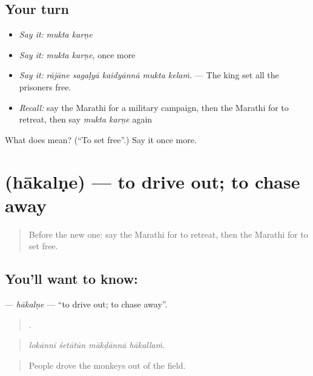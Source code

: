 \subsection*{Your turn}
\begin{itemize}
\raggedright
  \item \emph{Say it:} \emph{mukta karṇe}
  \item \emph{Say it:} \emph{mukta karṇe}, once more
  \item \emph{Say it:} \emph{rājāne sagaḷyā kaidyānnā mukta kelaṁ.} — The king set all the prisoners free.
  \item \emph{Recall:} say the Marathi for a military campaign, then the Marathi for to retreat, then say \emph{mukta karṇe} again
\end{itemize}

\begin{tcolorbox}[breakable,colback=teal!4,colframe=teal!35!black,title={Before you move on}]
What does   mean? (\textquotedblleft{}To set free\textquotedblright{}.) Say it once more.
\end{tcolorbox}
\section[\texorpdfstring{\mr{हाकलणे} (hākalṇe)}{हाकलणे (hākalṇe)}]{ (hākalṇe) — to drive out; to chase away}

\label{lesson:MR-C333-hakalne}



\begin{quote}
Before the new one: say the Marathi for to retreat, then the Marathi for to set free.
\end{quote}

\subsection*{You'll want to know: }
\textbf{} — \emph{hākalṇe} — \textquotedblleft{}to drive out; to chase away\textquotedblright{}.

\begin{quote}
   .
\end{quote}

\begin{quote}
\emph{lokānnī śetātūn mākḍānnā hākallaṁ.}
\end{quote}

\begin{quote}
People drove the monkeys out of the field.
\end{quote}

